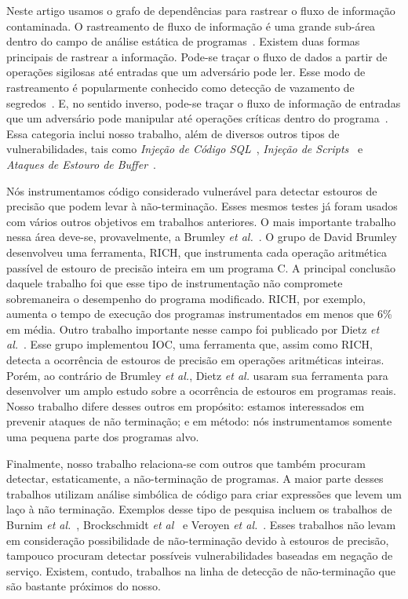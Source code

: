 \documentclass{llncs}
\begin{document}
Neste artigo usamos o grafo de dependências para rastrear o fluxo de
informação contaminada.
O rastreamento de fluxo de informação é uma grande sub-área dentro do campo de
análise estática de programas~\cite{Denning77}.
Existem duas formas principais de rastrear a informação.
Pode-se traçar o fluxo de dados a partir de operações sigilosas até entradas
que um adversário pode ler.
Esse modo de rastreamento é popularmente conhecido como detecção de vazamento
de segredos~\cite{Hammer06}.
E, no sentido inverso, pode-se traçar o fluxo de informação de entradas que
um adversário pode manipular até operações críticas dentro do
programa~\cite{Tripp09}.
Essa categoria inclui nosso trabalho, além de diversos outros tipos de
vulnerabilidades, tais como {\em Injeção de Código SQL}~\cite{Wassermann07},
{\em Injeção de Scripts}~\cite{Rimsa10} e {\em Ataques de Estouro de
Buffer}~\cite{Levy96}.

Nós instrumentamos código considerado vulnerável para detectar estouros de
precisão que podem levar à não-terminação.
Esses mesmos testes já foram usados com vários outros objetivos em trabalhos
anteriores.
O mais importante trabalho nessa área deve-se, provavelmente, a Brumley
{\em et al.}~\cite{Brumley07}.
O grupo de David Brumley desenvolveu uma ferramenta, RICH, que instrumenta
cada operação aritmética passível de estouro de precisão inteira em um programa
C.
A principal conclusão daquele trabalho foi que esse tipo de instrumentação
não compromete sobremaneira o desempenho do programa modificado.
RICH, por exemplo, aumenta o tempo de execução dos programas instrumentados
em menos que 6\% em média.
Outro trabalho importante nesse campo foi publicado por Dietz
{\em et al.}~\cite{Dietz12}.
Esse grupo implementou IOC, uma ferramenta que, assim como RICH, detecta a
ocorrência de estouros de precisão em operações aritméticas inteiras.
Porém, ao contrário de Brumley {\em et al.}, Dietz {\em et al.} usaram sua
ferramenta para desenvolver um amplo estudo sobre a ocorrência de estouros
em programas reais.
Nosso trabalho difere desses outros em propósito: estamos interessados em
prevenir ataques de não terminação; e em método: nós instrumentamos somente uma
pequena parte dos programas alvo.

Finalmente, nosso trabalho relaciona-se com outros que também procuram
detectar, estaticamente, a não-terminação de programas.
A maior parte desses trabalhos utilizam análise simbólica de código para criar
expressões que levem um laço à não terminação.
Exemplos desse tipo de pesquisa incluem os trabalhos de Burnim
{\em et al.}~\cite{Burnim09}, Brockschmidt {\em et al}~\cite{Brockschmidt11} e
Veroyen {\em et al.}~\cite{Velroyen08}.
Esses trabalhos não levam em consideração possibilidade de não-terminação
devido à estouros de precisão, tampouco procuram detectar possíveis
vulnerabilidades baseadas em negação de serviço.
Existem, contudo, trabalhos na linha de detecção de não-terminação que são
bastante próximos do nosso.
\end{document}
